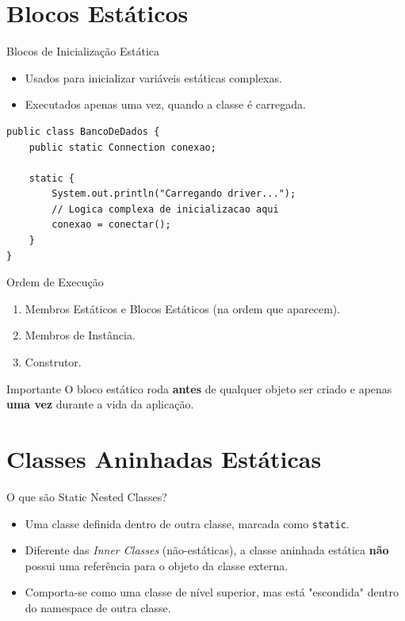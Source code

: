 \documentclass[9pt]{beamer}
\begin{document}
\section{Blocos Estáticos}

\begin{frame}[fragile]{Blocos de Inicialização Estática}
    \begin{itemize}
        \item Usados para inicializar variáveis estáticas complexas.
        \item Executados apenas uma vez, quando a classe é carregada.
    \end{itemize}
\begin{lstlisting}
public class BancoDeDados {
    public static Connection conexao;

    static {
        System.out.println("Carregando driver...");
        // Logica complexa de inicializacao aqui
        conexao = conectar();
    }
}
\end{lstlisting}
\end{frame}

\begin{frame}{Ordem de Execução}
    \begin{enumerate}
        \item Membros Estáticos e Blocos Estáticos (na ordem que aparecem).
        \item Membros de Instância.
        \item Construtor.
    \end{enumerate}
    \begin{alertblock}{Importante}
        O bloco estático roda \textbf{antes} de qualquer objeto ser criado e apenas \textbf{uma vez} durante a vida da aplicação.
    \end{alertblock}
\end{frame}

\section{Classes Aninhadas Estáticas}

\begin{frame}{O que são Static Nested Classes?}
    \begin{itemize}
        \item Uma classe definida dentro de outra classe, marcada como \texttt{static}.
        \item Diferente das \textit{Inner Classes} (não-estáticas), a classe aninhada estática \textbf{não} possui uma referência para o objeto da classe externa.
        \item Comporta-se como uma classe de nível superior, mas está "escondida" dentro do namespace de outra classe.
    \end{itemize}
\end{frame}
\end{document}
